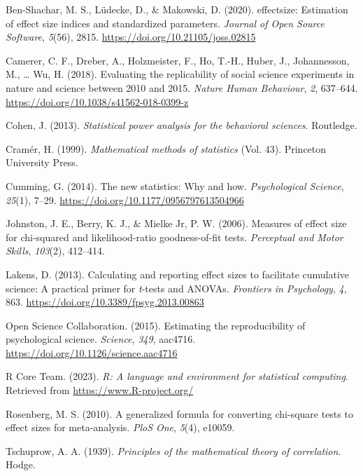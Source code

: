 \documentclass[
]{article}
\newlength{\cslhangindent}
\newlength{\cslentryspacingunit} %
\newenvironment{CSLReferences}[2] %
 {%
  \setlength{\parindent}{0pt}
  \ifodd #1
  \let\oldpar\par
  \def\par{\hangindent=\cslhangindent\oldpar}
  \fi
  \setlength{\parskip}{#2\cslentryspacingunit}
 }%
 {}
\begin{document}
\hypertarget{refs}{}
\begin{CSLReferences}{1}{0}
\leavevmode{}%
Ben-Shachar, M. S., Lüdecke, D., \& Makowski, D. (2020). {e}ffectsize:
Estimation of effect size indices and standardized parameters.
\emph{Journal of Open Source Software}, \emph{5}(56), 2815.
\url{https://doi.org/10.21105/joss.02815}

\leavevmode{}%
Camerer, C. F., Dreber, A., Holzmeister, F., Ho, T.-H., Huber, J.,
Johannesson, M., \ldots{} Wu, H. (2018). Evaluating the replicability of
social science experiments in nature and science between 2010 and 2015.
\emph{Nature Human Behaviour}, \emph{2}, 637--644.
\url{https://doi.org/10.1038/s41562-018-0399-z}

\leavevmode{}%
Cohen, J. (2013). \emph{Statistical power analysis for the behavioral
sciences}. Routledge.

\leavevmode{}%
Cramér, H. (1999). \emph{Mathematical methods of statistics} (Vol. 43).
Princeton University Press.

\leavevmode{}%
Cumming, G. (2014). The new statistics: Why and how. \emph{Psychological
Science}, \emph{25}(1), 7--29.
\url{https://doi.org/10.1177/0956797613504966}

\leavevmode{}%
Johnston, J. E., Berry, K. J., \& Mielke Jr, P. W. (2006). Measures of
effect size for chi-squared and likelihood-ratio goodness-of-fit tests.
\emph{Perceptual and Motor Skills}, \emph{103}(2), 412--414.

\leavevmode{}%
Lakens, D. (2013). Calculating and reporting effect sizes to facilitate
cumulative science: A practical primer for \emph{t}-tests and ANOVAs.
\emph{Frontiers in Psychology}, \emph{4}, 863.
\url{https://doi.org/10.3389/fpsyg.2013.00863}

\leavevmode{}%
Open Science Collaboration. (2015). Estimating the reproducibility of
psychological science. \emph{Science}, \emph{349}, aac4716.
\url{https://doi.org/10.1126/science.aac4716}

\leavevmode{}%
R Core Team. (2023). \emph{R: A language and environment for statistical
computing}. Retrieved from \url{https://www.R-project.org/}

\leavevmode{}%
Rosenberg, M. S. (2010). A generalized formula for converting chi-square
tests to effect sizes for meta-analysis. \emph{PloS One}, \emph{5}(4),
e10059.

\leavevmode{}%
Tschuprow, A. A. (1939). \emph{Principles of the mathematical theory of
correlation}. Hodge.

\end{CSLReferences}
\end{document}
